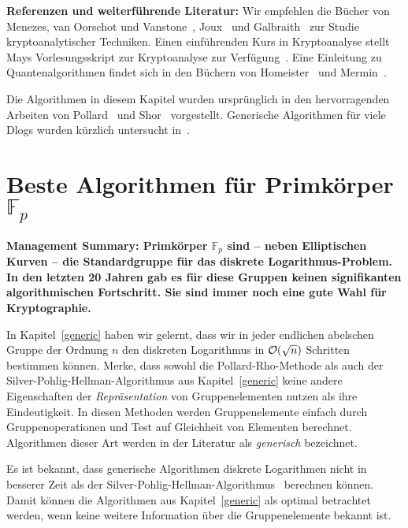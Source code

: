 \begin{refsegment}
\noindent \textbf{Referenzen und weiterführende Literatur:}
Wir empfehlen die Bücher von Menezes, van Oorschot und Vanstone~\cite{Menezes2001}, Joux~\cite{Joux2009} und Galbraith~\cite{Galbraith2012} zur Studie kryptoanalytischer Techniken. Einen einführenden Kurs in Kryptoanalyse stellt Mays Vorlesungsskript zur Kryptoanalyse zur Verfügung~\cite{May2012a,May2012b}. Eine Einleitung zu Quantenalgorithmen findet sich in den Büchern von Homeister~\cite{Homeister2007} und Mermin~\cite{Mermin2008}.

Die Algorithmen in diesem Kapitel wurden ursprünglich in den hervorragenden Arbeiten von Pollard~\cite{Pollard1975,Pollard2000} und Shor~\cite{Shor1994} vorgestellt.
Generische Algorithmen für viele Dlogs wurden kürzlich untersucht in~\cite{multiple2014}.


\newpage
\section{\texorpdfstring{Beste Algorithmen für Primkörper $\mathbb{F}_p$}{Beste Algorithmen für Primkörper Fp}}
\label{prime_field}
\textbf{Management Summary: Primkörper $\mathbb{F}_p$ sind -- neben Elliptischen Kurven -- die Standardgruppe für das diskrete Logarithmus-Problem. In den letzten 20 Jahren gab es für diese Gruppen keinen signifikanten algorithmischen Fortschritt. Sie sind immer noch eine gute Wahl für Kryptographie.\\[0.1cm]}

In Kapitel~\ref{generic} haben wir gelernt, dass wir in jeder endlichen abelschen Gruppe der Ordnung $n$ den diskreten Logarithmus in ${\cal O}(\sqrt n)$ Schritten bestimmen können. Merke, dass sowohl die Pollard-Rho-Methode als auch der Silver-Pohlig-Hellman-Algorithmus aus Kapitel~\ref{generic} keine andere Eigenschaften der {\em Repräsentation} von Gruppenelementen nutzen als ihre Eindeutigkeit. In diesen Methoden werden Gruppenelemente einfach durch Gruppenoperationen und Test auf Gleichheit von Elementen berechnet. Algorithmen dieser Art werden in der Literatur als {\em generisch} bezeichnet.

Es ist bekannt, dass generische Algorithmen diskrete Logarithmen nicht in besserer Zeit als der Silver-Pohlig-Hellman-Algorithmus~\cite{Shoup1997} berechnen können. Damit können die Algorithmen aus Kapitel~\ref{generic} als optimal betrachtet werden, wenn keine weitere Information über die Gruppenelemente bekannt ist.


\end{refsegment}
